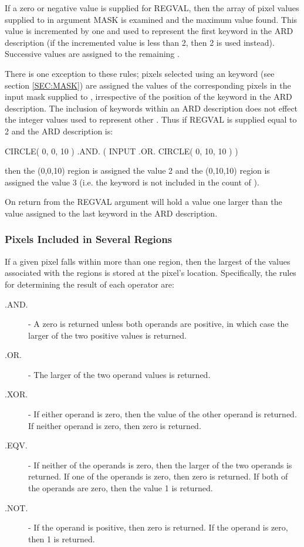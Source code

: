 \documentclass[11pt,nolof]{starlink}
\begin{document}
If a zero or negative value is supplied for REGVAL, then the array of pixel
values supplied to  in argument MASK is examined and the maximum value
found. This value is incremented by one and used to represent the first keyword
in the ARD description (if the incremented value is less than 2, then 2 is used
instead). Successive values are assigned to the remaining .

There is one exception to these rules; pixels selected using an  keyword
(see section \ref{SEC:MASK}) are assigned the values of the corresponding pixels
in the input mask supplied to , irrespective of the position of the
 keyword in the ARD description. The inclusion of  keywords within an
ARD description does not effect the integer values used to represent other
. Thus if REGVAL is supplied equal to 2 and the ARD description is:

\small
\begin{terminalv}
      CIRCLE( 0, 0, 10 ) .AND. ( INPUT .OR. CIRCLE( 0, 10, 10 ) )
\end{terminalv}
\normalsize

then the (0,0,10) region is assigned the value 2 and the (0,10,10)
region is assigned the value 3 (i.e. the  keyword is not included in the
count of ).

On return from  the REGVAL argument will hold a value one larger than
the value assigned to the last keyword in the ARD description.

\subsubsection{Pixels Included in Several Regions}
If a given pixel falls within more than one region, then the largest of the
values associated with the regions is stored at the pixel's location.
Specifically, the rules for determining the result of each operator are:

\begin{description}
\item [.AND.] - A zero is returned unless both operands are positive, in which
case the larger of the two positive values is returned.
\item [.OR.] - The larger of the two operand values is returned.
\item [.XOR.] - If either operand is zero, then the value of the other operand
is returned. If neither operand is zero, then zero is returned.
\item [.EQV.] - If neither of the operands is zero, then the larger of the two
operands is returned. If one of the operands is zero, then zero is returned. If
both of the operands are zero, then the value 1 is returned.
\item [.NOT.] - If the operand is positive, then zero is returned. If the
operand is zero, then 1 is returned.
\end{description}
\end{document}
